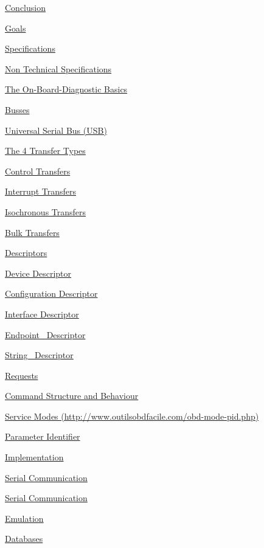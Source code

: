 {\protect\hyperlink{h.e4qn0u5p3hu9}{Conclusion}}

{\protect\hyperlink{h.lzjv4pe0xkgv}{Goals}}

{\protect\hyperlink{h.4p7xi5bvhxdr}{Specifications}}

{\protect\hyperlink{h.56kfpodyq5td}{Non Technical Specifications}}

{\protect\hyperlink{h.m62hdjh1p5au}{The On-Board-Diagnostic Basics}}

{\protect\hyperlink{h.a007s3g11xnb}{Busses}}

{\protect\hyperlink{h.g52kpz9o7mut}{Universal Serial Bus (USB)}}

{\protect\hyperlink{h.sndep0jf1bfd}{The 4 Transfer Types}}

{\protect\hyperlink{h.90a05v4yh1c6}{Control Transfers}}

{\protect\hyperlink{h.nxp3faj0xgfy}{Interrupt Transfers}}

{\protect\hyperlink{h.icibxq66s779}{Isochronous Transfers}}

{\protect\hyperlink{h.3yadg7wz9shv}{Bulk Transfers}}

{\protect\hyperlink{h.c8rxmh3196o7}{Descriptors}}

{\protect\hyperlink{h.1mpv5d9ppg1r}{Device Descriptor}}

{\protect\hyperlink{h.73p9cggljvzi}{Configuration Descriptor}}

{\protect\hyperlink{h.6og933fa49b9}{Interface Descriptor}}

{\protect\hyperlink{h.v1p4ngh8b7ot}{Endpoint ~Descriptor}}

{\protect\hyperlink{h.tyeikwcmymv0}{String ~Descriptor}}

{\protect\hyperlink{h.n9ec73ci5cit}{Requests}}

{\protect\hyperlink{h.sukmqmhc4ldi}{Command Structure and Behaviour}}

{\protect\hyperlink{h.4dw71h9dkw49}{Service Modes
(http://www.outilsobdfacile.com/obd-mode-pid.php)}}

{\protect\hyperlink{h.zg0lajxcv3vk}{Parameter Identifier}}

{\protect\hyperlink{h.k3ecyfg5l7ib}{Implementation}}

{\protect\hyperlink{h.o5tk1rwy6zuu}{Serial Communication}}

{\protect\hyperlink{h.8ukx9pv2y8wv}{Serial Communication}}

{\protect\hyperlink{h.nfl0zlavkqps}{Emulation}}

{\protect\hyperlink{h.rpls244qrcic}{Databases}}

